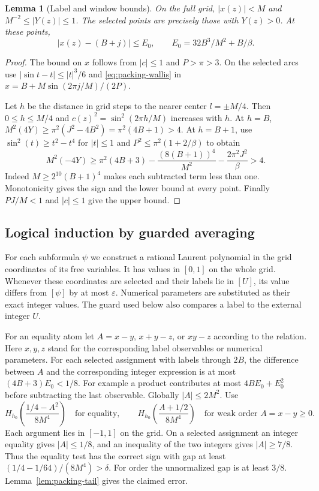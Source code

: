 \documentclass[11pt,letterpaper]{article}
\newtheorem{lemma}[theorem]{Lemma}
\numberwithin{equation}{section}
\begin{document}
\begin{lemma}[Label and window bounds]\label{lem:packing-label}
On the full grid, $|x(z)|<M$ and $M^{-2}\le |Y(z)|\le1$.
The selected points are precisely those with $Y(z)>0$. At these points,
\[
 |x(z)-(B+j)|\le E_0,\qquad E_0=32B^3/M^2+B/\beta .
\]
\end{lemma}
\begin{proof}
The bound on $x$ follows from $|c|\le1$ and $P>\pi>3$. On the
selected arcs use $|\sin t-t|\le |t|^3/6$ and
\eqref{eq:packing-wallis} in
$x=B+M\sin(2\pi j/M)/(2P)$.

Let $h$ be the distance in grid steps to the nearer center
$l=\pm M/4$. Then $0\le h\le M/4$ and
$c(z)^2=\sin^2(2\pi h/M)$ increases with $h$. At $h=B$,
$M^2(4Y)\ge \pi^2(J^2-4B^2)=\pi^2(4B+1)>4$.
At $h=B+1$, use $\sin^2(t)\ge t^2-t^4$ for $|t|\le1$
and $P^2\le\pi^2(1+2/\beta)$ to obtain
\[
 M^2(-4Y)\ge \pi^2(4B+3)
       -\frac{(8(B+1))^4}{M^2}-\frac{2\pi^2J^2}{\beta}>4 .
\]
Indeed $M\ge 2^{10}(B+1)^4$ makes each subtracted term less than one.
Monotonicity gives the sign and the lower bound at every point.
Finally $PJ/M<1$ and $|c|\le1$ give the upper bound.
\end{proof}

\subsection{Logical induction by guarded averaging}

For each subformula $\psi$ we construct a rational Laurent polynomial
in the grid coordinates of its free variables. It has values in
$[0,1]$ on the whole grid. Whenever these coordinates are selected
and their labels lie in $[U]$, its value differs from $[\psi]$ by
at most $\varepsilon$. Numerical parameters are substituted as their
exact integer values. The guard used below also compares a label to
the external integer $U$.

For an equality atom let $A=x-y$, $x+y-z$, or $xy-z$ according to the
relation. Here $x,y,z$ stand for the corresponding label observables
or numerical parameters. For each selected assignment with labels
through $2B$, the difference between $A$ and the corresponding
integer expression is at most $(4B+3)E_0<1/8$. For example a product
contributes at most $4BE_0+E_0^2$ before subtracting the last
observable. Globally $|A|\le2M^2$. Use
\[
 H_{h_0}\!\left(\frac{1/4-A^2}{8M^4}\right)
 \quad\text{for equality},\qquad
 H_{h_0}\!\left(\frac{A+1/2}{8M^4}\right)
 \quad\text{for weak order }A=x-y\ge0.
\]
Each argument lies in $[-1,1]$ on the grid. On a selected assignment
an integer equality gives $|A|\le1/8$, and an inequality of the two
integers gives $|A|\ge7/8$. Thus the equality test has the correct
sign with gap at least $(1/4-1/64)/(8M^4)>\delta$. For order the
unnormalized gap is at least $3/8$. Lemma~\ref{lem:packing-tail}
gives the claimed error.
\end{document}
